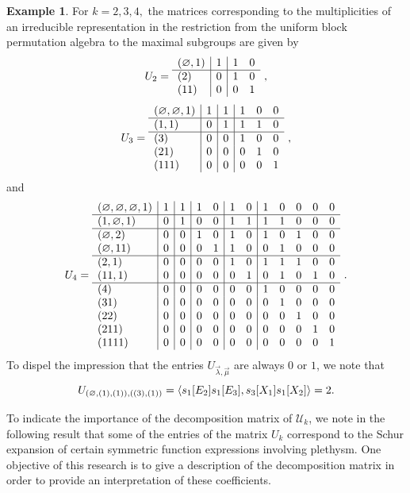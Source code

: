 \documentclass[10pt]{amsart}
\theoremstyle{definition}
\newtheorem{example}[theorem]{Example}
\theoremstyle{remark}
\newcommand{\epart}{\text{\footnotesize$\varnothing$}}
\begin{document}
\begin{example}  
For $k=2,3,4,$ the matrices corresponding to the multiplicities of an irreducible 
representation in the restriction from the uniform block permutation algebra
to the maximal subgroups are given by
$$
U_2 =
\begin{array}{l|r|rr}
(\epart, 1) & 1 & 1 & 0\\
\hline
(2) & 0 & 1 & 0\\
(11) & 0 & 0 & 1
\end{array}~,
$$
$$
U_3 = \begin{array}{l|r|r|rrr}
(\epart, \epart, 1) & 1 & 1 & 1 & 0 & 0\\
\hline
(1, 1) & 0 & 1 & 1 & 1 & 0\\
\hline
(3) & 0 & 0 & 1 & 0 & 0\\
(21) & 0 & 0 & 0 & 1 & 0\\
(111) & 0 & 0 & 0 & 0 & 1
\end{array}~,
$$
and
$$
U_4 = \begin{array}{l|r|r|rr|rr|rrrrr}
(\epart, \epart, \epart, 1) & 1 & 1 & 1 & 0 & 1 & 0 & 1 & 0 & 0 & 0 & 0\\
\hline
(1, \epart, 1) &0 & 1 & 0 & 0 & 1 & 1 & 1 & 1 & 0 & 0 & 0\\
\hline
(\epart, 2) &0 & 0 & 1 & 0 & 1 & 0 & 1 & 0 & 1 & 0 & 0\\
(\epart, 11) &0 & 0 & 0 & 1 & 1 & 0 & 0 & 1 & 0 & 0 & 0\\
\hline
(2, 1) &0 & 0 & 0 & 0 & 1 & 0 & 1 & 1 & 1 & 0 & 0\\
(11, 1) &0 & 0 & 0 & 0 & 0 & 1 & 0 & 1 & 0 & 1 & 0\\
\hline
(4) &0 & 0 & 0 & 0 & 0 & 0 & 1 & 0 & 0 & 0 & 0\\
(31) &0 & 0 & 0 & 0 & 0 & 0 & 0 & 1 & 0 & 0 & 0\\
(22) &0 & 0 & 0 & 0 & 0 & 0 & 0 & 0 & 1 & 0 & 0\\
(211) &0 & 0 & 0 & 0 & 0 & 0 & 0 & 0 & 0 & 1 & 0\\
(1111) &0 & 0 & 0 & 0 & 0 & 0 & 0 & 0 & 0 & 0 & 1
\end{array}~.
$$
To dispel the impression that the entries $U_{\vec{\lambda},\vec{\mu}}$ are always $0$ or $1$,
we note that
\begin{equation*}
    U_{(\epart,(1),(1)), ((3),(1))} = \left< s_1[E_2] s_1[E_3], s_3[X_1] s_1[X_2] \right> = 2.
\end{equation*}
\end{example}

To indicate the importance of the decomposition matrix of $\mathcal{U}_k$,
we note in the following result that some of the entries of the matrix $U_k$
correspond to the Schur expansion of certain
symmetric function expressions involving plethysm.
One objective of this research is to give a description of
the decomposition matrix in order to provide an interpretation
of these coefficients.
\end{document}
